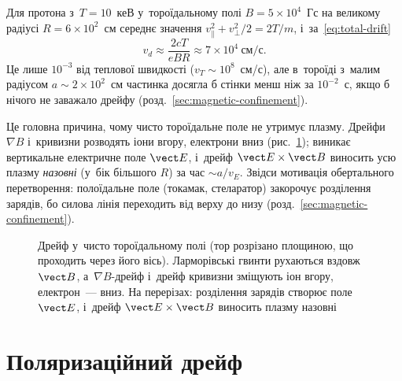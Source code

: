 \begin{Estimate}
Для протона з~$T=10$~кеВ у~тороїдальному полі $B=5\times10^4$~Гс на великому радіусі
$R=6\times10^2$~см середнє значення $v_\parallel^2+v_\perp^2/2=2T/m$, і~за~\eqref{eq:total-drift}
\[v_d\approx\frac{2cT}{eBR}\approx7\times10^{4}~\text{см/с}.\]
Це лише $10^{-3}$ від теплової швидкості ($v_T\sim10^8$~см/с), але в~тороїді з~малим радіусом
$a\sim2\times10^2$~см частинка досягла б стінки менш ніж за $10^{-2}$~с, якщо б нічого не заважало
дрейфу (розд.~\ref{sec:magnetic-confinement}).
\end{Estimate}

Це головна причина, чому чисто тороїдальне поле не утримує плазму. Дрейфи $\nabla B$ і~кривизни розводять іони вгору, електрони вниз
(рис.~\ref{fig:toroidal-drift}); виникає вертикальне електричне поле $\vect E$, і~дрейф $\vect E\times\vect B$ виносить усю плазму
\emph{назовні} (у~бік більшого $R$) за час $\sim a/v_E$. Звідси мотивація обертального перетворення: полоїдальне поле (токамак, стеларатор) закорочує розділення зарядів,
бо силова лінія переходить від верху до низу (розд.~\ref{sec:magnetic-confinement}).

\begin{figure}[ht]\centering
	\caption{Дрейф у~чисто тороїдальному полі (тор розрізано площиною, що проходить через його вісь).
	Ларморівські гвинти рухаються вздовж $\vect B$, а~$\nabla B$-дрейф і~дрейф кривизни зміщують іон вгору, електрон~--- вниз.
	На перерізах: розділення зарядів створює поле $\vect E$, і~дрейф $\vect E\times\vect B$ виносить плазму назовні}
	\label{fig:toroidal-drift}
\end{figure}



\section{Поляризаційний дрейф}



